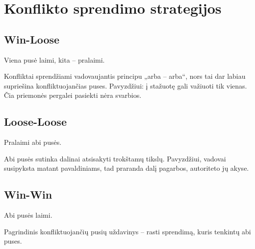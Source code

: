 \section{Konflikto sprendimo strategijos}

\subsection{Win-Loose}

Viena pusė laimi, kita – pralaimi.

Konfliktai sprendžiami vadovaujantis principu „arba – arba“, nors tai
dar labiau supriešina konfliktuojančias puses. Pavyzdžiui: į stažuotę
gali važiuoti tik vienas. Čia priemonės pergalei pasiekti nėra
svarbios.

\subsection{Loose-Loose}

Pralaimi abi pusės.

Abi pusės sutinka dalinai atsisakyti trokštamų tikslų. Pavyzdžiui, vadovai
susipyksta matant pavaldiniams, tad praranda dalį pagarbos, autoriteto
jų akyse.

\subsection{Win-Win}

Abi pusės laimi.

Pagrindinis konfliktuojančių pusių uždavinys – rasti sprendimą, kuris
tenkintų abi puses.

